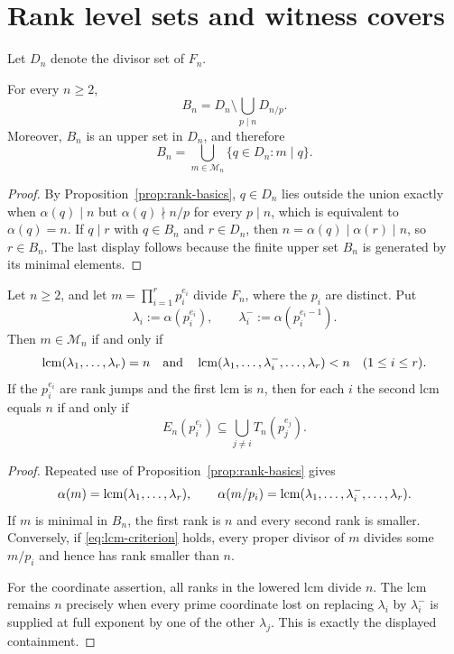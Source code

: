 \section{Rank level sets and witness covers}\label{sec:upper-fibers}

Let $D_n$ denote the divisor set of $F_n$.

\begin{lemma}\label{thm:upper-fiber}
For every $n\geq2$,
\[
 B_n=D_n\setminus\bigcup_{p\mid n}D_{n/p}.
\]
Moreover, $B_n$ is an upper set in $D_n$, and therefore
\[
 B_n=\bigcup_{m\in\mathcal M_n}\{q\in D_n:m\mid q\}.
\]
\end{lemma}

\begin{proof}
By Proposition~\ref{prop:rank-basics}, $q\in D_n$ lies outside the union
exactly when $\alpha(q)\mid n$ but $\alpha(q)\nmid n/p$ for every
$p\mid n$, which is equivalent to $\alpha(q)=n$.  If $q\mid r$ with
$q\in B_n$ and $r\in D_n$, then
$n=\alpha(q)\mid\alpha(r)\mid n$, so $r\in B_n$.  The last display follows
because the finite upper set $B_n$ is generated by its minimal elements.
\end{proof}

\begin{lemma}
\label{thm:minimal-generators}
Let $n\geq2$, and let $m=\prod_{i=1}^r p_i^{e_i}$ divide $F_n$, where the
$p_i$ are distinct.  Put
\[
 \lambda_i:=\alpha(p_i^{e_i}),\qquad
 \lambda_i^-:=\alpha(p_i^{e_i-1}).
\]
Then $m\in\mathcal M_n$ if and only if
\begin{equation}\label{eq:lcm-criterion}
 \operatorname{lcm}(\lambda_1,\ldots,\lambda_r)=n
\quad\text{and}\quad
 \operatorname{lcm}(\lambda_1,\ldots,\lambda_i^-,\ldots,\lambda_r)<n
 \quad(1\leq i\leq r).
\end{equation}
If the $p_i^{e_i}$ are rank jumps and the first lcm is $n$, then for each
$i$ the second lcm equals $n$ if and only if
\[
 E_n(p_i^{e_i})\subseteq
 \bigcup_{j\ne i}T_n(p_j^{e_j}).
\]
\end{lemma}

\begin{proof}
Repeated use of Proposition~\ref{prop:rank-basics} gives
\[
 \alpha(m)=\operatorname{lcm}(\lambda_1,\ldots,\lambda_r),\qquad
 \alpha(m/p_i)=
 \operatorname{lcm}(\lambda_1,\ldots,\lambda_i^-,\ldots,\lambda_r).
\]
If $m$ is minimal in $B_n$, the first rank is $n$ and every second rank is
smaller.  Conversely, if \eqref{eq:lcm-criterion} holds, every proper divisor
of $m$ divides some $m/p_i$ and hence has rank smaller than $n$.

For the coordinate assertion, all ranks in the lowered lcm divide $n$.
The lcm remains $n$ precisely when every prime coordinate lost on replacing
$\lambda_i$ by $\lambda_i^-$ is supplied at full exponent by one of the
other $\lambda_j$.  This is exactly the displayed containment.
\end{proof}

